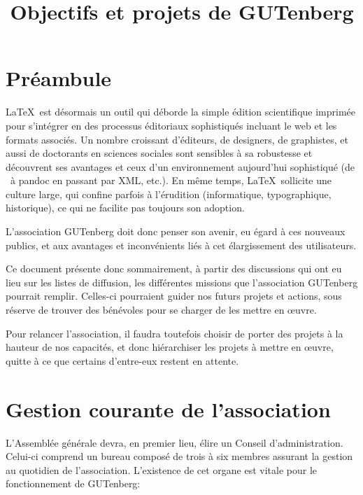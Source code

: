 \documentclass{tufte-handout}
\title{Objectifs et projets de GUTenberg}
\author{}
\date{}
\newcommand{\ratio}[3][]{\marginpar{\footnotesize{\textcolor{teal}{Temps requis: #2 / Utilité: #3}\par\noindent \textcolor{teal}{#1}}}}
\begin{document}
\maketitle


\section*{Préambule}

\LaTeX\ est désormais un outil  qui déborde la simple édition scientifique imprimée pour s'intégrer en des processus éditoriaux sophistiqués incluant  le web et les formats associés. Un nombre croissant d'éditeurs, de  designers, de graphistes, et aussi de doctorants en sciences sociales sont sensibles à sa robustesse et découvrent ses avantages et ceux d'un environnement aujourd'hui sophistiqué (de \LuaLaTeX\ à pandoc en passant par XML, etc.). En même temps, \LaTeX\ sollicite une culture large, qui confine parfois à l'érudition (informatique, typographique, historique), ce qui ne facilite pas toujours son adoption. 
	
L'association GUTenberg doit donc penser son avenir, eu égard à ces nouveaux publics, et aux avantages et inconvénients liés à cet élargissement des utilisateurs.
	
	
Ce document présente donc sommairement, à partir des discussions qui ont eu lieu sur les listes de diffusion, les différentes missions que l'association GUTenberg pourrait remplir. Celles-ci pourraient guider nos futurs projets et actions, sous réserve de trouver des bénévoles pour se charger de les mettre en œuvre.

Pour relancer l'association, il faudra toutefois choisir de porter des projets à la hauteur de nos capacités, et donc hiérarchiser les projets à mettre en œuvre, quitte à ce que certains d'entre-eux restent en attente.

\tableofcontents

\clearpage


\section{Gestion courante de l'association}

L'Assemblée générale\ratio[Investissement régulier et dans la durée, les mandats durant 4 ans]{+++}{+++} devra, en premier lieu, élire un Conseil d'administration. Celui-ci comprend un bureau composé de trois à six membres assurant la gestion au quotidien de l'association. L'existence de cet organe est vitale pour le fonctionnement de GUTenberg:
\end{document}
